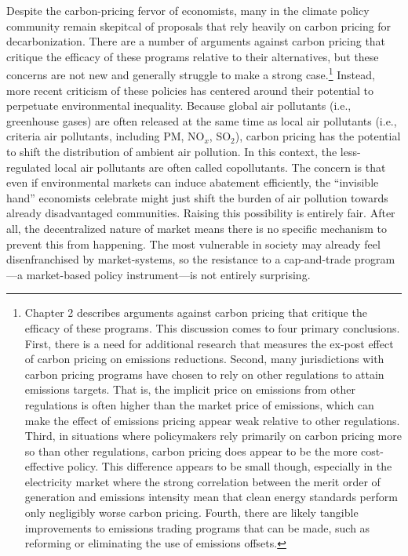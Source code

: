 Despite the carbon-pricing fervor of economists, many in the climate policy community remain skepitcal of proposals that rely heavily on carbon pricing for decarbonization. There are a number of arguments against carbon pricing that critique the efficacy of these programs relative to their alternatives, but these concerns are not new and generally struggle to make a strong case.\footnote{Chapter 2 describes arguments against carbon pricing that critique the efficacy of these programs. This discussion comes to four primary conclusions. First, there is a need for additional research that measures the ex-post effect of carbon pricing on emissions reductions. Second, many jurisdictions with carbon pricing programs have chosen to rely on other regulations to attain emissions targets. That is, the implicit price on emissions from other regulations is often higher than the market price of emissions, which can make the effect of emissions pricing appear weak relative to other regulations. Third, in situations where policymakers rely primarily on carbon pricing more so than other regulations, carbon pricing does appear to be the more cost-effective policy. This difference appears to be small though, especially in the electricity market where the strong correlation between the merit order of generation and emissions intensity mean that clean energy standards perform only negligibly worse carbon pricing. Fourth, there are likely tangible improvements to emissions trading programs that can be made, such as reforming or eliminating the use of emissions offsets. 
} Instead, more recent criticism of these policies has centered around their potential to perpetuate environmental inequality. Because global air pollutants (i.e., greenhouse gases) are often released at the same time as local air pollutants (i.e., criteria air pollutants, including PM, NO$_x$, SO$_2$), carbon pricing has the potential to shift the distribution of ambient air pollution. In this context, the less-regulated local air pollutants are often called copollutants. The concern is that even if environmental markets can induce abatement efficiently, the ``invisible hand'' economists celebrate might just shift the burden of air pollution towards already disadvantaged communities. Raising this possibility is entirely fair. After all, the decentralized nature of market means there is no specific mechanism to prevent this from happening. The most vulnerable in society may already feel disenfranchised by market-systems, so the resistance to a cap-and-trade program---a market-based policy instrument---is not entirely surprising. 

